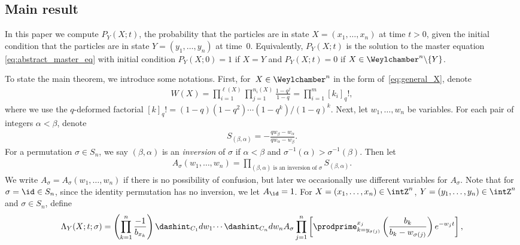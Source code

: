 \subsection{Main result}

In this paper we compute $P_Y(X; t)$, the probability that the particles are in state $X \!= \! (x_1, \dotsc, x_n)$ at time $t > 0$, given the initial condition that the particles are in state $Y = (y_1, \dotsc, y_n)$ at time~$0$. Equivalently, $P_Y(X; t)$ is the solution to the master equation \eqref{eq:abstract_master_eq} with initial condition $P_Y(X; 0) = 1$ if $X = Y$ and $P_Y(X; t) = 0$ if $X \in \Weylchamber^n {\setminus} \{ Y \}$.

To state the main theorem, we introduce some notations. First, for~$X \in \Weylchamber^n$ in the form of~\eqref{eq:general_X}, denote
\begin{gather*}
 W(X) = \prod^{\ell(X)}_{i = 1} \prod^{n_i(X)}_{j = 1} \frac{1 - q^j}{1 - q} = \prod^m_{i = 1} [k_i]_q!,
\end{gather*}
where we use the $q$-deformed factorial $[k]_q! = (1 - q)(1 - q^2) \dotsb (1 - q^k)/(1 - q)^k$. Next, let $w_1, \dotsc, w_n$ be variables. For each pair of integers $\alpha < \beta$, denote
\begin{gather*}
 S_{(\beta, \alpha)} = -\frac{q w_{\beta} - w_{\alpha}}{q w_{\alpha} - w_{\beta}}.
\end{gather*}
For a permutation $\sigma \in S_n$, we say $(\beta, \alpha)$ is an \emph{inversion} of $\sigma$ if $\alpha < \beta$ and $\sigma^{-1}(\alpha) > \sigma^{-1}(\beta)$. Then let
\begin{gather*}
 A_{\sigma}(w_1, \dotsc, w_n) = \prod_{(\beta, \alpha) \text{ is an inversion of } \sigma} S_{(\beta, \alpha)}.
\end{gather*}
We write $A_{\sigma} = A_{\sigma}(w_1, \dotsc, w_n)$ if there is no possibility of confusion, but later we occasionally use dif\/ferent variables for $A_{\sigma}$. Note that for $\sigma = \id \in S_n$, since the identity permutation has no inversion, we let $A_{\id} = 1$. For $X = (x_1, \dotsc, x_n) \in \intZ^n$, $Y = (y_1, \dotsc, y_n) \in \intZ^n$ and $\sigma \in S_n$, def\/ine
\begin{gather} \label{eq:integral_Lambda}
 \Lambda_Y(X; t; \sigma) = \left( \prod^n_{k = 1} \frac{-1}{b_{x_k}} \right) \dashint_{C_1} dw_1 \dotsi \dashint_{C_n} dw_n A_{\sigma} \prod^n_{j = 1} \left[ \prodprime^{x_j}_{k = y_{\sigma(j)}} \left( \frac{b_k}{b_k - w_{\sigma(j)}} \right) e^{-w_j t} \right],
\end{gather}
